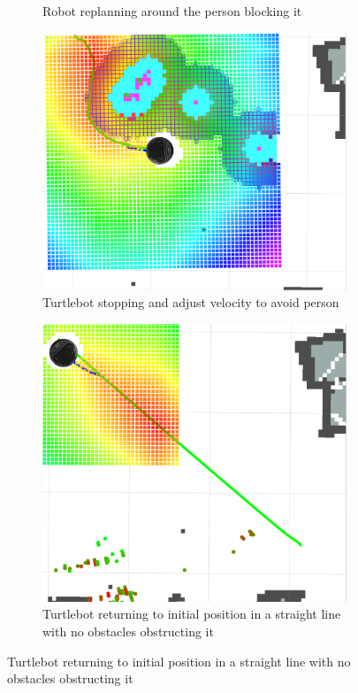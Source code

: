 \begin{figure}[ht!]
\begin{subfigure}[b]{0.49\linewidth}
    \caption{Robot replanning around the person blocking it}
    \label{fig::radarperson2}
  \end{subfigure}
  \begin{subfigure}[b]{0.49\linewidth}
    \includegraphics[width=\linewidth]{imgs/chapter5/radarperson3.png}
    \caption{Turtlebot stopping and adjust velocity to avoid person}
    \label{fig::radarperson3}
  \end{subfigure}
  \begin{subfigure}[b]{0.49\linewidth}
    \includegraphics[width=\linewidth]{imgs/chapter5/radarperson4.png}
    \caption{Turtlebot returning to initial position in a straight line with no obstacles obstructing it}
    \label{fig::radarperson4}
  \end{subfigure}
\end{figure}
